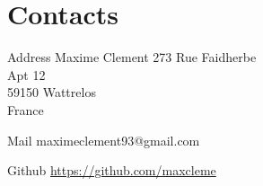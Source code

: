 \documentclass[hidelinks]{cv-style}          %
\begin{document}

\section{Contacts}

\begin{entrylist}
\entry
  {Address}
  {Maxime Clement}
  {}
  {
  273 Rue Faidherbe\\
Apt 12\\
59150 Wattrelos\\
France\\
}

\entry
  {Mail}
  {maximeclement93@gmail.com}
  {}
  {}
  
\entry
  {Github}
  {\url{https://github.com/maxcleme}}
  {}
  {}
\end{entrylist}
\end{document}
